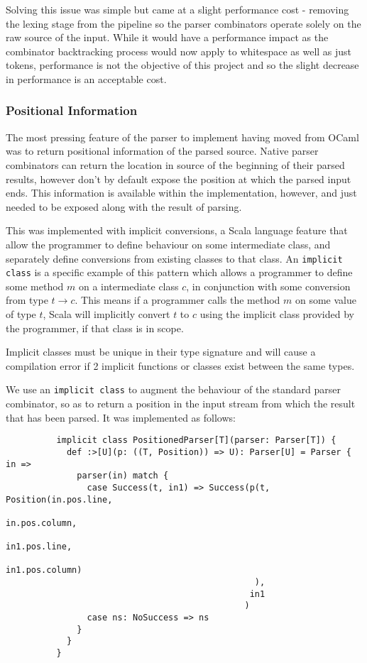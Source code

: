\documentclass[british, twoside, openright]{bhamthesis}
\theoremstyle{definition}
\begin{document}
        Solving this issue was simple but came at a slight performance cost - removing the lexing stage from the pipeline so the parser combinators operate solely on the raw source of the input. While it would have a performance impact as the combinator backtracking process would now apply to whitespace as well as just tokens, performance is not the objective of this project and so the slight decrease in performance is an acceptable cost.

      \subsubsection{Positional Information}
        The most pressing feature of the parser to implement having moved from OCaml was to return positional information of the parsed source. Native parser combinators can return the location in source of the beginning of their parsed results, however don't by default expose the position at which the parsed input ends. This information is available within the implementation, however, and just needed to be exposed along with the result of parsing.

         This was implemented with implicit conversions, a Scala language feature that allow the programmer to define behaviour on some intermediate class, and separately define conversions from existing classes to that class. An \texttt{implicit class} is a specific example of this pattern which allows a programmer to define some method $m$ on a intermediate class $c$, in conjunction with some conversion from type $t\rightarrow c$. This means if a programmer calls the method $m$ on some value of type $t$, Scala will implicitly convert $t$ to $c$ using the implicit class provided by the programmer, if that class is in scope.

        Implicit classes must be unique in their type signature and will cause a compilation error if 2 implicit functions or classes exist between the same types.

        We use an \texttt{implicit class} to augment the behaviour of the standard parser combinator, so as to return a position in the input stream from which the result that has been parsed. It was implemented as follows:

        \begin{lstlisting}
          implicit class PositionedParser[T](parser: Parser[T]) {
            def :>[U](p: ((T, Position)) => U): Parser[U] = Parser { in =>
              parser(in) match {
                case Success(t, in1) => Success(p(t, Position(in.pos.line,
                                                              in.pos.column,
                                                              in1.pos.line,
                                                              in1.pos.column)
                                                 ),
                                                in1
                                               )
                case ns: NoSuccess => ns
              }
            }
          }
        \end{lstlisting}
\end{document}
